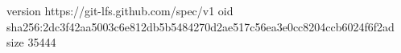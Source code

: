 version https://git-lfs.github.com/spec/v1
oid sha256:2dc3f42aa5003c6e812db5b5484270d2ae517c56ea3e0cc8204ccb6024f6f2ad
size 35444
